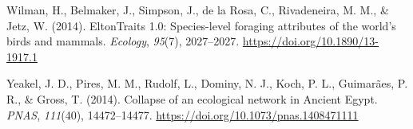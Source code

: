 \documentclass[
]{agujournal2019}
\newlength{\cslhangindent}
\newenvironment{CSLReferences}[2] %
 {\begin{list}{}{%
  \setlength{\itemindent}{0pt}
  \setlength{\leftmargin}{0pt}
  \setlength{\parsep}{0pt}
  \ifodd #1
   \setlength{\leftmargin}{\cslhangindent}
   \setlength{\itemindent}{-1\cslhangindent}
  \fi
  \setlength{\itemsep}{#2\baselineskip}}}
 {\end{list}}
\begin{document}
\begin{CSLReferences}{1}{0}
Wilman, H., Belmaker, J., Simpson, J., de la Rosa, C., Rivadeneira, M.
M., \& Jetz, W. (2014). {EltonTraits} 1.0: {Species-level} foraging
attributes of the world's birds and mammals. \emph{Ecology},
\emph{95}(7), 2027--2027. \url{https://doi.org/10.1890/13-1917.1}

Yeakel, J. D., Pires, M. M., Rudolf, L., Dominy, N. J., Koch, P. L.,
Guimarães, P. R., \& Gross, T. (2014). Collapse of an ecological network
in {Ancient Egypt}. \emph{PNAS}, \emph{111}(40), 14472--14477.
\url{https://doi.org/10.1073/pnas.1408471111}

\end{CSLReferences}
\end{document}
